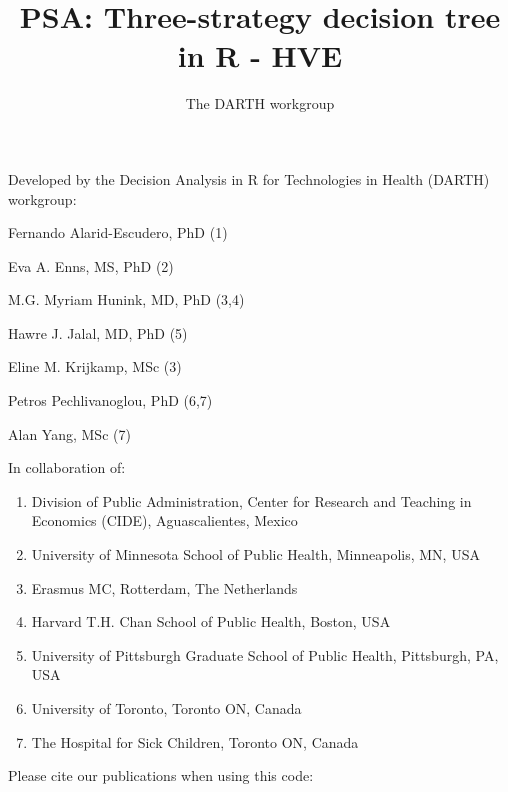 \documentclass[
]{article}
\title{PSA: Three-strategy decision tree in R - HVE}
\author{The DARTH workgroup}
\date{}
\providecommand{\tightlist}{%
  \setlength{\itemsep}{0pt}\setlength{\parskip}{0pt}}
\begin{document}
\maketitle

Developed by the Decision Analysis in R for Technologies in Health
(DARTH) workgroup:

Fernando Alarid-Escudero, PhD (1)

Eva A. Enns, MS, PhD (2)

M.G. Myriam Hunink, MD, PhD (3,4)

Hawre J. Jalal, MD, PhD (5)

Eline M. Krijkamp, MSc (3)

Petros Pechlivanoglou, PhD (6,7)

Alan Yang, MSc (7)

In collaboration of:

\begin{enumerate}
\def\labelenumi{\arabic{enumi}.}
\tightlist
\item
  Division of Public Administration, Center for Research and Teaching in
  Economics (CIDE), Aguascalientes, Mexico
\item
  University of Minnesota School of Public Health, Minneapolis, MN, USA
\item
  Erasmus MC, Rotterdam, The Netherlands
\item
  Harvard T.H. Chan School of Public Health, Boston, USA
\item
  University of Pittsburgh Graduate School of Public Health, Pittsburgh,
  PA, USA
\item
  University of Toronto, Toronto ON, Canada
\item
  The Hospital for Sick Children, Toronto ON, Canada
\end{enumerate}

Please cite our publications when using this code:
\end{document}
